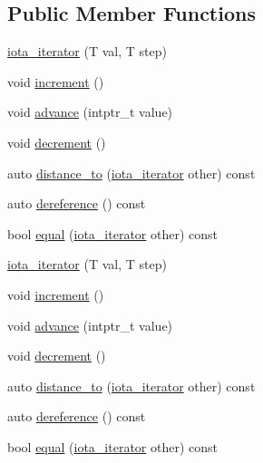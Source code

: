 \subsection*{Public Member Functions}
\begin{DoxyCompactItemize}
\item 
\mbox{\hyperlink{structrah_1_1view_1_1iota__iterator_a7807733a9a9609f8b9652e270551dc9b}{iota\+\_\+iterator}} (T val, T step)
\item 
void \mbox{\hyperlink{structrah_1_1view_1_1iota__iterator_a52be6587654c9783137bf31d800f315d}{increment}} ()
\item 
void \mbox{\hyperlink{structrah_1_1view_1_1iota__iterator_afdc7732c688daecb60d17b45a678e1f1}{advance}} (intptr\+\_\+t value)
\item 
void \mbox{\hyperlink{structrah_1_1view_1_1iota__iterator_ab11421ab7ec8d986bdf7ef5f930d0b43}{decrement}} ()
\item 
auto \mbox{\hyperlink{structrah_1_1view_1_1iota__iterator_a3662abe8721e4c5c7bbc4214e36c4920}{distance\+\_\+to}} (\mbox{\hyperlink{structrah_1_1view_1_1iota__iterator}{iota\+\_\+iterator}} other) const
\item 
auto \mbox{\hyperlink{structrah_1_1view_1_1iota__iterator_ae31c733c52f77c7c199802db6638541d}{dereference}} () const
\item 
bool \mbox{\hyperlink{structrah_1_1view_1_1iota__iterator_ada1691e363efa9b5c945a302296e63d5}{equal}} (\mbox{\hyperlink{structrah_1_1view_1_1iota__iterator}{iota\+\_\+iterator}} other) const
\item 
\mbox{\hyperlink{structrah_1_1view_1_1iota__iterator_a7807733a9a9609f8b9652e270551dc9b}{iota\+\_\+iterator}} (T val, T step)
\item 
void \mbox{\hyperlink{structrah_1_1view_1_1iota__iterator_a52be6587654c9783137bf31d800f315d}{increment}} ()
\item 
void \mbox{\hyperlink{structrah_1_1view_1_1iota__iterator_afdc7732c688daecb60d17b45a678e1f1}{advance}} (intptr\+\_\+t value)
\item 
void \mbox{\hyperlink{structrah_1_1view_1_1iota__iterator_ab11421ab7ec8d986bdf7ef5f930d0b43}{decrement}} ()
\item 
auto \mbox{\hyperlink{structrah_1_1view_1_1iota__iterator_a3662abe8721e4c5c7bbc4214e36c4920}{distance\+\_\+to}} (\mbox{\hyperlink{structrah_1_1view_1_1iota__iterator}{iota\+\_\+iterator}} other) const
\item 
auto \mbox{\hyperlink{structrah_1_1view_1_1iota__iterator_ae31c733c52f77c7c199802db6638541d}{dereference}} () const
\item 
bool \mbox{\hyperlink{structrah_1_1view_1_1iota__iterator_ada1691e363efa9b5c945a302296e63d5}{equal}} (\mbox{\hyperlink{structrah_1_1view_1_1iota__iterator}{iota\+\_\+iterator}} other) const
\end{DoxyCompactItemize}
